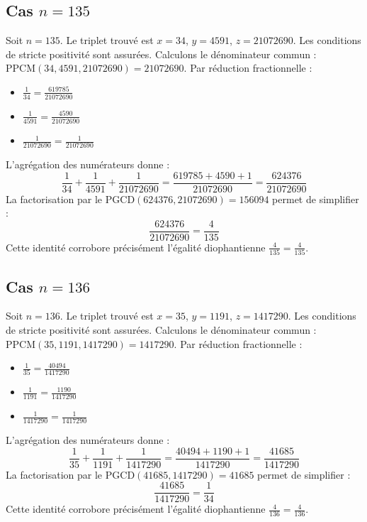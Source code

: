 \documentclass[11pt,a4paper]{article}
\begin{document}
\subsection{Cas $n = 135$}
Soit $n = 135$. Le triplet trouvé est $x = 34$, $y = 4591$, $z = 21072690$.
Les conditions de stricte positivité sont assurées.
Calculons le dénominateur commun : $\text{PPCM}(34, 4591, 21072690) = 21072690$.
Par réduction fractionnelle :
\begin{itemize}
    \item $\frac{1}{34} = \frac{619785}{21072690}$
    \item $\frac{1}{4591} = \frac{4590}{21072690}$
    \item $\frac{1}{21072690} = \frac{1}{21072690}$
\end{itemize}
L'agrégation des numérateurs donne :
$$ \frac{1}{34} + \frac{1}{4591} + \frac{1}{21072690} = \frac{619785 + 4590 + 1}{21072690} = \frac{624376}{21072690} $$
La factorisation par le $\text{PGCD}(624376, 21072690) = 156094$ permet de simplifier :
$$ \frac{624376}{21072690} = \frac{4}{135} $$
Cette identité corrobore précisément l'égalité diophantienne $\frac{4}{135} = \frac{4}{135}$.

\subsection{Cas $n = 136$}
Soit $n = 136$. Le triplet trouvé est $x = 35$, $y = 1191$, $z = 1417290$.
Les conditions de stricte positivité sont assurées.
Calculons le dénominateur commun : $\text{PPCM}(35, 1191, 1417290) = 1417290$.
Par réduction fractionnelle :
\begin{itemize}
    \item $\frac{1}{35} = \frac{40494}{1417290}$
    \item $\frac{1}{1191} = \frac{1190}{1417290}$
    \item $\frac{1}{1417290} = \frac{1}{1417290}$
\end{itemize}
L'agrégation des numérateurs donne :
$$ \frac{1}{35} + \frac{1}{1191} + \frac{1}{1417290} = \frac{40494 + 1190 + 1}{1417290} = \frac{41685}{1417290} $$
La factorisation par le $\text{PGCD}(41685, 1417290) = 41685$ permet de simplifier :
$$ \frac{41685}{1417290} = \frac{1}{34} $$
Cette identité corrobore précisément l'égalité diophantienne $\frac{4}{136} = \frac{4}{136}$.
\end{document}
